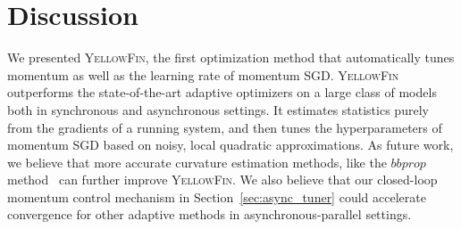 \documentclass{article} %
\newcommand{\tuner}{\textsc{YellowFin}\xspace}
\begin{document}
\vspace{-0.5em}
\section{Discussion}
\label{sec:discussion}
\vspace{-0.45em}
We presented \tuner, the first optimization method that automatically tunes momentum as well as the learning rate of momentum SGD. 
\tuner outperforms the state-of-the-art adaptive optimizers on a large class of models both in synchronous and asynchronous settings.
It estimates statistics purely from the gradients of a running system,
and then tunes the hyperparameters of momentum SGD based on noisy, local quadratic approximations.
As future work, we believe that more accurate curvature estimation methods,
like the $bbprop$ method~\citep{martens2012estimating} can further improve \tuner.
We also believe that our closed-loop momentum control mechanism in Section~\ref{sec:async_tuner} 
could accelerate convergence for other adaptive methods in asynchronous-parallel settings.







\appendix 

%
%

%





%
\end{document}

